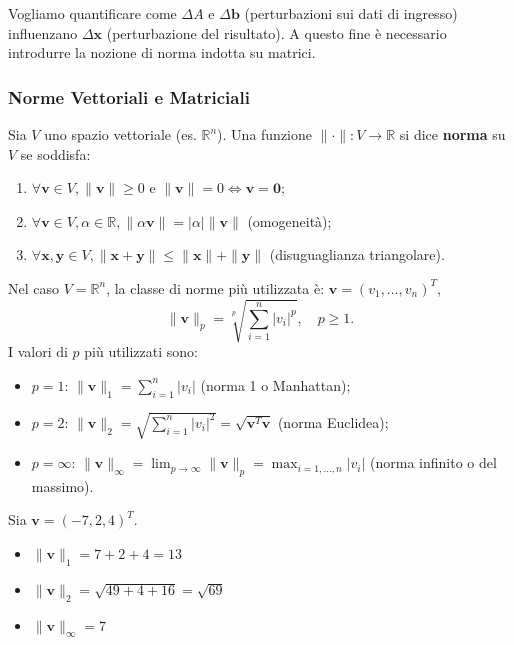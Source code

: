 Vogliamo quantificare come $\Delta A$ e $\Delta \mathbf{b}$ (perturbazioni sui dati di ingresso) influenzano $\Delta \mathbf{x}$ (perturbazione del risultato). A questo fine è necessario introdurre la nozione di norma indotta su matrici.

\subsubsection{Norme Vettoriali e Matriciali}

\begin{definition}
Sia $V$ uno spazio vettoriale (es. $\mathbb{R}^n$). Una funzione $\| \cdot \|: V \to \mathbb{R}$ si dice \textbf{norma} su $V$ se soddisfa:
\begin{enumerate}
    \item $\forall \mathbf{v} \in V, \| \mathbf{v} \| \ge 0$ e $\| \mathbf{v} \| = 0 \iff \mathbf{v} = \mathbf{0}$;
    \item $\forall \mathbf{v} \in V, \alpha \in \mathbb{R}, \| \alpha \mathbf{v} \| = |\alpha| \| \mathbf{v} \|$ (omogeneità);
    \item $\forall \mathbf{x}, \mathbf{y} \in V, \| \mathbf{x} + \mathbf{y} \| \le \| \mathbf{x} \| + \| \mathbf{y} \|$ (disuguaglianza triangolare).
\end{enumerate}
\end{definition}

Nel caso $V = \mathbb{R}^n$, la classe di norme più utilizzata è: $\mathbf{v} = (v_1, \dots, v_n)^T$,
$$ \| \mathbf{v} \|_p = \sqrt[p]{\sum_{i=1}^n |v_i|^p}, \quad p \ge 1. $$
I valori di $p$ più utilizzati sono:
\begin{itemize}
    \item $p=1$: $\| \mathbf{v} \|_1 = \sum_{i=1}^n |v_i|$ (norma 1 o Manhattan);
    \item $p=2$: $\| \mathbf{v} \|_2 = \sqrt{\sum_{i=1}^n |v_i|^2} = \sqrt{\mathbf{v}^T \mathbf{v}}$ (norma Euclidea);
    \item $p=\infty$: $\| \mathbf{v} \|_\infty = \lim_{p \to \infty} \| \mathbf{v} \|_p = \max_{i=1,\dots,n} |v_i|$ (norma infinito o del massimo).
\end{itemize}

\begin{esempio}
Sia $\mathbf{v} = (-7, 2, 4)^T$.
\begin{itemize}
    \item $\| \mathbf{v} \|_1 = 7 + 2 + 4 = 13$
    \item $\| \mathbf{v} \|_2 = \sqrt{49 + 4 + 16} = \sqrt{69}$
    \item $\| \mathbf{v} \|_\infty = 7$
\end{itemize}
\end{esempio}

